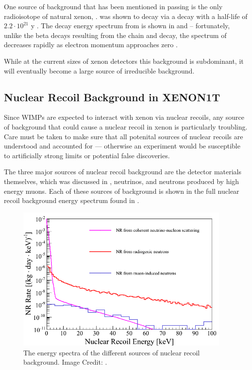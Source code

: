 One source of background that has been mentioned in passing is the only radioisotope of natural xenon, \radioxenon{}.  \radioxenon{} was shown to decay via a \doublebeta{} decay with a half-life of $2.2 \cdot 10^{21}$ y \cite{barros2014double}.  The \doublebeta{} decay energy spectrum from \radioxenon{} is shown in  and  -- fortunately, unlike the beta decays resulting from the \radon{} chain and \krypton{} decay, the spectrum of \radioxenon{} decreases rapidly as electron momentum approaches zero \cite{ponkratenko2000event}.

While at the current sizes of xenon detectors this background is subdominant, it will eventually become a large source of irreducible background. 


\subsection{Nuclear Recoil Background in XENON1T}
\label{sec:xe1t_nr_bkg}

Since WIMPs are expected to interact with xenon via nuclear recoils, any source of background that could cause a nuclear recoil in xenon is particularly troubling.  Care must be taken to make sure that all potenital sources of nuclear recoils are understood and accounted for --- otherwise an experiment would be susceptible to artificially strong limits or potential false discoveries.

The three major sources of nuclear recoil background are the detector materials themselves, which was discussed in , neutrinos, and neutrons produced by high energy muons.  Each of these sources of background is shown in the full nuclear recoil background energy spectrum found in .  

\begin{figure}[t]
	\centering
	\includegraphics[width=0.95\textwidth]{xe1t_low_energy_nr_bkg}
	\caption{The energy spectra of the different sources of nuclear recoil background.  Image Credit: .}
	\label{fig:xe1t_nr_bkg}
\end{figure}



